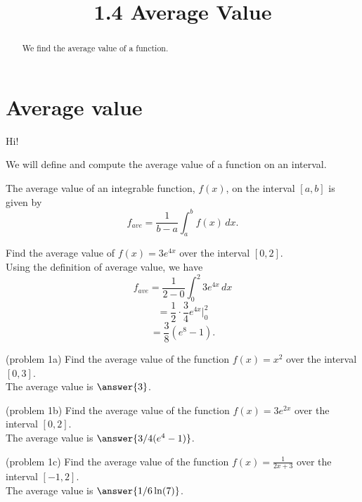 \documentclass[handout]{ximera}
\title{1.4 Average Value}
\begin{document}
\begin{abstract}
We find the average value of a function.
\end{abstract}

\maketitle

\section{Average value}
Hi!

We will define and compute the average value of a function on an interval. 

\begin{definition} The average value of an integrable function, $f(x)$, on the interval $[a,b]$ is given by
\[
f_{ave} = \frac{1}{b-a} \int_a^b f(x) \, dx.
\]
\end{definition}

\begin{example}[example 1]
Find the average value of $f(x) = 3e^{4x}$ over the interval $[0, 2]$.\\
Using the definition of average value, we have
\[
f_{ave} = \frac{1}{2-0} \int_0^2 3e^{4x} \, dx
\]
\[
= \frac12 \cdot \frac34e^{4x} \bigg|_0^2
\]
\[
= \frac38 \left(e^8 - 1\right).
\]
\end{example}




\begin{problem}(problem 1a)
Find the average value of the function $f(x) = x^2$ over the interval $[0, 3]$.\\
The average value is $\answer{3}$.
\end{problem}





\begin{problem}(problem 1b)
Find the average value of the function $f(x) = 3e^{2x}$ over the interval $[0, 2]$.\\
The average value is $\answer{3/4 (e^4 - 1)}$.
\end{problem}




\begin{problem}(problem 1c)
Find the average value of the function $f(x) = \displaystyle{\frac{1}{2x+3}}$ over the interval $[-1, 2]$.\\
The average value is $\answer{1/6 \ln(7)}$.
\end{problem}
\end{document}
